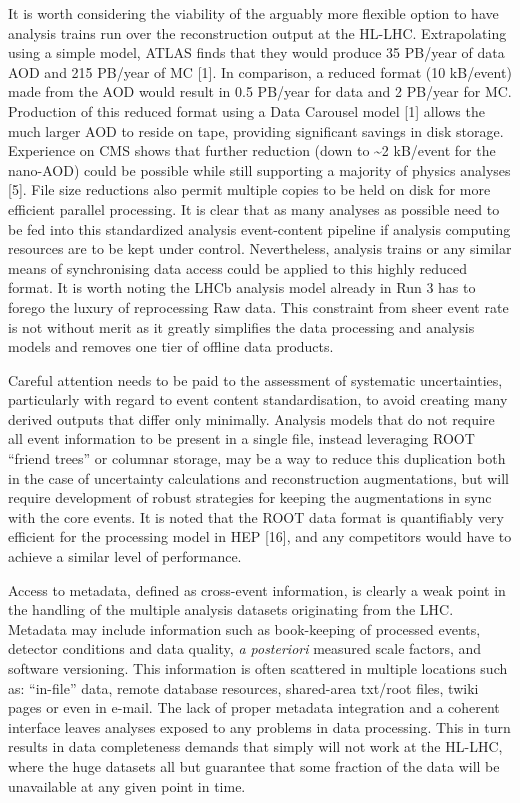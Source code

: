 \documentclass[10pt,a4paper]{article}
\begin{document}
It is worth considering the viability of the arguably more flexible
option to have analysis trains run over the reconstruction output at the
HL-LHC. Extrapolating using a simple model, ATLAS finds that they would
produce 35 PB/year of data AOD and 215 PB/year of MC {[}1{]}. In
comparison, a reduced format (10 kB/event) made from the AOD would
result in 0.5 PB/year for data and 2 PB/year for MC. Production of this
reduced format using a Data Carousel model {[}1{]} allows the much
larger AOD to reside on tape, providing significant savings in disk
storage. Experience on CMS shows that further reduction (down to
\textasciitilde2 kB/event for the nano-AOD) could be possible while
still supporting a majority of physics analyses {[}5{]}. File size
reductions also permit multiple copies to be held on disk for more
efficient parallel processing. It is clear that as many analyses as
possible need to be fed into this standardized analysis event-content
pipeline if analysis computing resources are to be kept under control.
Nevertheless, analysis trains or any similar means of synchronising data
access could be applied to this highly reduced format. It is worth
noting the LHCb analysis model already in Run 3 has to forego the luxury
of reprocessing Raw data. This constraint from sheer event rate is not
without merit as it greatly simplifies the data processing and analysis
models and removes one tier of offline data products.

Careful attention needs to be paid to the assessment of systematic
uncertainties, particularly with regard to event content
standardisation, to avoid creating many derived outputs that differ only
minimally. Analysis models that do not require all event information to
be present in a single file, instead leveraging ROOT ``friend trees'' or
columnar storage, may be a way to reduce this duplication both in the
case of uncertainty calculations and reconstruction augmentations, but
will require development of robust strategies for keeping the
augmentations in sync with the core events. It is noted that the ROOT
data format is quantifiably very efficient for the processing model in
HEP {[}16{]}, and any competitors would have to achieve a similar level
of performance.

Access to metadata, defined as cross-event information, is clearly a
weak point in the handling of the multiple analysis datasets originating
from the LHC. Metadata may include information such as book-keeping of
processed events, detector conditions and data quality, \emph{a
posteriori} measured scale factors, and software versioning. This
information is often scattered in multiple locations such as:
``in-file'' data, remote database resources, shared-area txt/root files,
twiki pages or even in e-mail. The lack of proper metadata integration
and a coherent interface leaves analyses exposed to any problems in data
processing. This in turn results in data completeness demands that
simply will not work at the HL-LHC, where the huge datasets all but
guarantee that some fraction of the data will be unavailable at any
given point in time.
\end{document}
